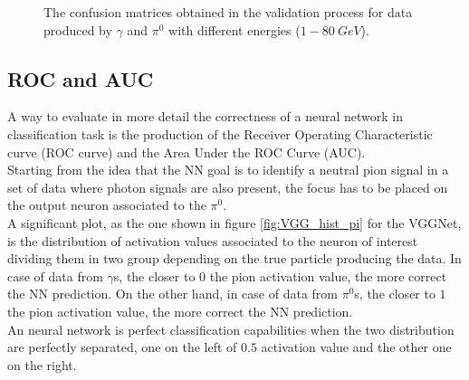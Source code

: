 \begin{figure}
	\centering
	 \quad
	\caption{The confusion matrices obtained in the validation process for data produced by $\gamma$ and $\pi^0$ with different energies ($1 - 80\ GeV$).}
	\label{fig:CM_rangeE}
\end{figure}

\subsection*{ROC and AUC}
A way to evaluate in more detail the correctness of a neural network in classification task is the production of the Receiver Operating Characteristic curve (ROC curve) and the Area Under the ROC Curve (AUC).\\

Starting from the idea that the NN goal is to identify a neutral pion signal in a set of data where photon signals are also present, the focus has to be placed on the output neuron associated to the $\pi^0$.\\
A significant plot, as the one shown in figure \ref{fig:VGG_hist_pi} for the VGGNet, is the distribution of activation values associated to the neuron of interest dividing them in two group depending on the true particle producing the data.
In case of data from $\gamma$s, the closer to $0$ the pion activation value, the more correct the NN prediction.
On the other hand, in case of data from $\pi^0$s, the closer to $1$ the pion activation value, the more correct the NN prediction.\\
An neural network is perfect classification capabilities when the two distribution are perfectly separated, one on the left of $0.5$ activation value and the other one on the right.\\

